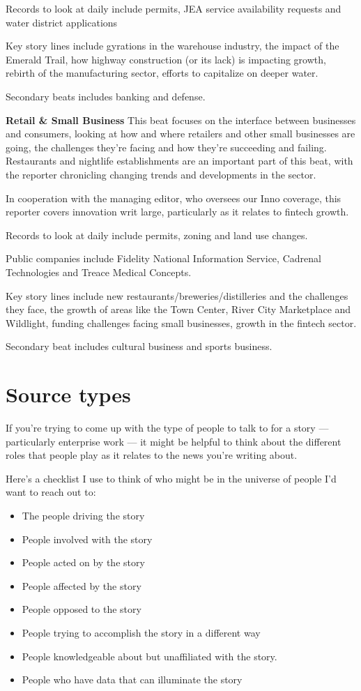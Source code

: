 \documentclass[
  11pt,
  american,
  letterpaperpaper,
  extrafontsizes,onecolumn,openright
  ]{memoir}
\providecommand{\tightlist}{%
  \setlength{\itemsep}{0pt}\setlength{\parskip}{0pt}}
\newlength{\rf}
\begin{document}
Records to look at daily include permits, JEA service availability requests and water district applications

Key story lines include gyrations in the warehouse industry, the impact of the Emerald Trail, how highway construction (or its lack) is impacting growth, rebirth of the manufacturing sector, efforts to capitalize on deeper water.

Secondary beats includes banking and defense.

\textbf{Retail \& Small Business}
This beat focuses on the interface between businesses and consumers, looking at how and where retailers and other small businesses are going, the challenges they're facing and how they're succeeding and failing. Restaurants and nightlife establishments are an important part of this beat, with the reporter chronicling changing trends and developments in the sector.

In cooperation with the managing editor, who oversees our Inno coverage, this reporter covers innovation writ large, particularly as it relates to fintech growth.

Records to look at daily include permits, zoning and land use changes.

Public companies include Fidelity National Information Service, Cadrenal Technologies and Treace Medical Concepts.

Key story lines include new restaurants/breweries/distilleries and the challenges they face, the growth of areas like the Town Center, River City Marketplace and Wildlight, funding challenges facing small businesses, growth in the fintech sector.

Secondary beat includes cultural business and sports business.

\hypertarget{source-types}{%
\chapter{Source types}\label{source-types}}

If you're trying to come up with the type of people to talk to for a story --- particularly enterprise work --- it might be helpful to think about the different roles that people play as it relates to the news you're writing about.

Here's a checklist I use to think of who might be in the universe of people I'd want to reach out to:

\begin{itemize}
\tightlist
\item
  The people driving the story
\item
  People involved with the story
\item
  People acted on by the story
\item
  People affected by the story
\item
  People opposed to the story
\item
  People trying to accomplish the story in a different way
\item
  People knowledgeable about but unaffiliated with the story.
\item
  People who have data that can illuminate the story
\end{itemize}
\end{document}
